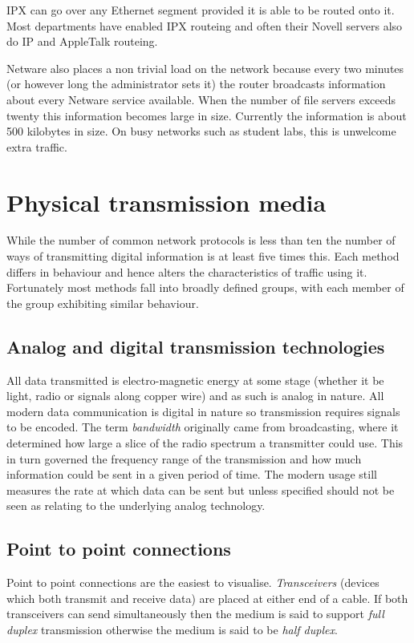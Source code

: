 IPX can go over any Ethernet segment provided it is able to be routed
onto it.  Most departments have enabled IPX routeing and often their
Novell servers also do IP and AppleTalk routeing.

Netware also places a non trivial load on the network because every
two minutes (or however long the administrator sets it) the router
broadcasts information about every Netware service available.  When
the number of file servers exceeds twenty this information becomes
large in size.  Currently the information is about 500 kilobytes in
size.  On busy networks such as student labs, this is unwelcome extra
traffic.

\section{Physical transmission media}

While the number of common network protocols is less than ten the
number of ways of transmitting digital information is at least five
times this.  Each method differs in behaviour and hence alters the
characteristics of traffic using it.  Fortunately most methods fall
into broadly defined groups, with each member of the group exhibiting
similar behaviour.

\subsection{Analog and digital transmission technologies}

All data transmitted is electro-magnetic energy at some stage (whether
it be light, radio or signals along copper wire) and as such is analog
in nature.  All modern data communication is digital in nature so
transmission requires signals to be encoded.  The term {\em bandwidth}
originally came from broadcasting, where it determined how large a
slice of the radio spectrum a transmitter could use.  This in turn
governed the frequency range of the transmission and how much
information could be sent in a given period of time.  The modern usage
still measures the rate at which data can be sent but unless specified
should not be seen as relating to the underlying analog technology.

\subsection{Point to point connections}

Point to point connections are the easiest to visualise.  {\em
Transceivers} (devices which both transmit and receive data) are
placed at either end of a cable.  If both transceivers can send
simultaneously then the medium is said to support {\em full duplex}
transmission otherwise the medium is said to be {\em half duplex}.

